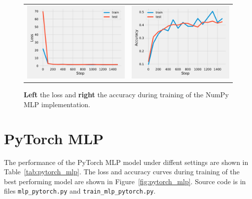\documentclass{article}
\newcommand\·{\ensuremath{\cdot}}
\newcommand\…{\ensuremath{\dots}}
\newcommand{\⇔}{\ensuremath{\Leftrightarrow}}
\newcommand{\⇐}{\ensuremath{\Rightarrow}}
\newcommand{\⇒}{\ensuremath{\Leftarrow}}
\newcommand\1{\ensuremath{\mathds{1}}}
\newcommand\ℝ{\ensuremath{\mathds{R}}}
\begin{document}
\begin{figure}
  \begin{tabularx}{\linewidth}{XX}
    \includegraphics[width=\linewidth]{assignment_1/code/np_loss.pdf} &
    \includegraphics[width=\linewidth]{assignment_1/code/np_accuracy.pdf}
  \end{tabularx}
  \caption{\textbf{Left} the loss and \textbf{right} the accuracy during training of the NumPy MLP implementation.}
  \label{fig:numpy}
\end{figure}

\section{PyTorch MLP}
The performance of the PyTorch MLP model under diffent settings are shown in Table~\ref{tab:pytorch_mlp}.
The loss and accuracy curves during training of the best performing model are shown in Figure~\ref{fig:pytorch_mlp}.
Source code is in files \texttt{mlp\_pytorch.py} and \texttt{train\_mlp\_pytorch.py}.
\end{document}
